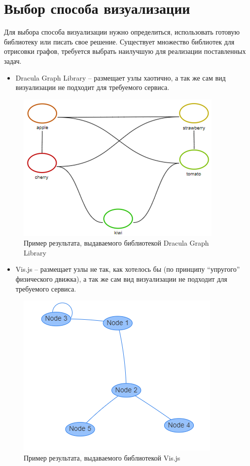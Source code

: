 \section{Выбор способа визуализации} \label{ch4:sec3}
Для выбора способа визуализации нужно определиться, использовать готовую библиотеку или писать свое решение.
Существует множество библиотек для отрисовки графов, требуется выбрать наилучшую для реализации поставленных задач.
\begin{itemize}
\item Dracula Graph Library – размещает узлы хаотично, а так же сам вид визуализации не подходит для требуемого сервиса.
\end{itemize}
\begin{figure}[h]
	\center
	\includegraphics [scale=1] {my_folder/images/my/13}
	\caption{Пример результата, выдаваемого библиотекой Dracula Graph Library}
	\label{fig:13}
\end{figure}
\newpage
\begin{itemize}
\item Vis.js – размещает узлы не так, как хотелось бы (по принципу “упругого” физического движка), а так же сам вид визуализации не подходит для требуемого сервиса.
\end{itemize}
\begin{figure}[h]
	\center
	\includegraphics [scale=0.9] {my_folder/images/my/14}
	\caption{Пример результата, выдаваемого библиотекой Vis.js}
	\label{fig:14}
\end{figure}
